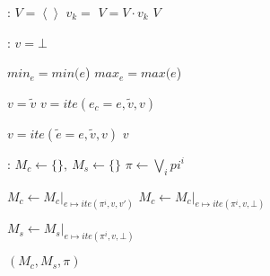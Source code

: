 \documentclass{article}
\begin{document}
\begin{algorithm}
  \begin{algorithmic}[1]
	:
		\State $V = \left\langle \right\rangle$ 
			\State $v_k = $ 
			\State $V = V \cdot v_k$
		\EndFor
		\State \Return $V$
	\EndFunction
  \end{algorithmic}

  \bigskip

  \begin{algorithmic}[1]
	:
		\State $v = \bot$ 

		\State $min_e = min(e$)
		\State $max_e = max(e$)

				\State ${v} = \widetilde{v}$
			\EndIf
		\Else
					\State $v = ite(e_c = e, \widetilde{v}, v)$
				\EndIf
			\EndFor
		\EndIf

				\State $v = ite(\widetilde{e} = e, \widetilde{v}, v)$
			\EndIf
		\EndFor
		\State \Return $v$
	\EndFunction
  \end{algorithmic}
  
\end{algorithm}

\begin{algorithm}
  \begin{algorithmic}[1]
	:
		\State $M_c \leftarrow \{\},~M_s \leftarrow \{\}$
		\State $\pi \leftarrow \bigvee\limits_{i} pi^i $
		\State

				\State $M_c \leftarrow {M_c}\vert_{e \mapsto ite(\pi^i, v, v')}$
			\Else
				\State $M_c \leftarrow {M_c}\vert_{e \mapsto ite(\pi^i, v, \bot)}$
			\EndIf
		\EndFor

		\State

			\State $M_s \leftarrow {M_s}\vert_{e \mapsto ite(\pi^i, v, \bot)}$
		\EndFor

		\State
		\State \Return $(M_c, M_s, \pi)$
	\EndFunction
  \end{algorithmic}
\end{algorithm}
\end{document}
